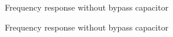 \documentclass[a4paper,11pt]{article}
\begin{document}
\begin{figure}[h]
\begin{center}
\caption{Frequency response without bypass capacitor}
\end{center}
\vspace{-30pt}
\end{figure}

\begin{figure}[h]
\begin{center}
\caption{Frequency response without bypass capacitor}
\end{center}

\end{figure}
\vspace{-30pt}


 
\end{document}
